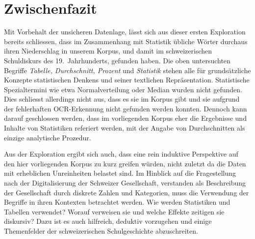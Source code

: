 \section{Zwischenfazit}

Mit Vorbehalt der unsicheren Datenlage, lässt sich aus dieser ersten Exploration bereits schliessen, dass im Zusammenhang mit Statistik übliche Wörter durchaus ihren Niederschlag in unserem Korpus, und damit im schweizerischen Schuldiskurs des 19.~Jahrhunderts, gefunden haben. Die oben untersuchten Begriffe \textit{Tabelle, Durchschnitt, Prozent} und \textit{Statistik} stehen alle für grundsätzliche Konzepte statistischen Denkens und seiner textlichen Repräsentation. Statistische Spezialtermini wie etwa Normalverteilung oder Median wurden nicht gefunden. Dies schliesst allerdings nicht aus, dass es sie im Korpus gibt und sie aufgrund der fehlerhaften OCR-Erkennung nicht gefunden werden konnten. Dennoch kann darauf geschlossen werden, dass im vorliegenden Korpus eher die Ergebnisse und Inhalte von Statistiken referiert werden, mit der Angabe von Durchschnitten als einzige analytische Prozedur.

Aus der Exploration ergibt sich auch, dass eine rein induktive Perspektive auf den hier vorliegenden Korpus zu kurz greifen würden, nicht zuletzt da die Daten mit erheblichen Unreinheiten belastet sind. Im Hinblick auf die Fragestellung nach der Digitalisierung der Schweizer Gesellschaft, verstanden als Beschreibung der Gesellschaft durch diskrete Zahlen und Kategorien, muss die Verwendung der Begriffe in ihren Kontexten betrachtet werden. Wie werden Statistiken und Tabellen verwendet? Worauf verweisen sie und welche Effekte zeitigen sie diskursiv? Dazu ist es auch hilfreich, deduktiv vorzugehen und einige Themenfelder der schweizerischen Schulgeschichte abzuschreiten.